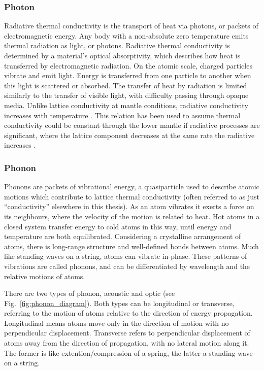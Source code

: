 \subsubsection{Photon}

Radiative thermal conductivity is the transport of heat via photons, or packets of electromagnetic energy. Any body with a non-absolute zero temperature emits thermal radiation as light, or photons. Radiative thermal conductivity is determined by a material's optical absorptivity, which describes how heat is transferred by electromagnetic radiation. On the atomic scale, charged particles vibrate and emit light. Energy is transferred from one particle to another when this light is scattered or absorbed. The transfer of heat by radiation is limited similarly to the transfer of visible light, with difficulty passing through opaque media. Unlike lattice conductivity at mantle conditions, radiative conductivity increases with temperature \citep{Hofmeister1999}. This relation has been used to assume thermal conductivity could be constant through the lower mantle if radiative processes are significant, where the lattice component decreases at the same rate the radiative increases \citep{Tang2014}.

\subsubsection{Phonon}
\label{sec.phonon_explan}



Phonons are packets of vibrational energy, a quasiparticle used to describe atomic motions which contribute to lattice thermal conductivity (often referred to as just ``conductivity'' elsewhere in this thesis). As an atom vibrates it exerts a force on its neighbours, where the velocity of the motion is related to heat. Hot atoms in a closed system transfer energy to cold atoms in this way, until energy and temperature are both equilibrated. Considering a crystalline arrangement of atoms, there is long-range structure and well-defined bonds between atoms. Much like standing waves on a string, atoms can vibrate in-phase. These patterns of vibrations are called phonons, and can be differentiated by wavelength and the relative motions of atoms.

There are two types of phonon, acoustic and optic (see Fig.~\ref{fig:phonon_diagram}). Both types can be longitudinal or transverse, referring to the motion of atoms relative to the direction of energy propagation. Longitudinal means atoms move only in the direction of motion with no perpendicular displacement. Transverse refers to perpendicular displacement of atoms away from the direction of propagation, with no lateral motion along it. The former is like extention/compression of a spring, the latter a standing wave on a string.
 
